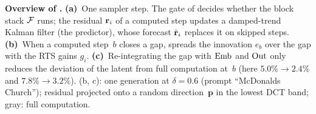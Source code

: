 %     
\caption{\textbf{Overview of \ours.}
\textbf{(a)}~One sampler step. The \sea gate of \seacache decides whether the block stack $\blocks$ runs; the residual
$\res_i$ of a computed step updates a damped-trend Kalman filter (the predictor), whose forecast $\hat\res_i$ replaces
it on skipped steps. \textbf{(b)}~When a computed step~$b$ closes a gap, \pcgs spreads the innovation $e_b$ over the gap
with the RTS gains $g_i$. \textbf{(c)}~Re-integrating the gap with $\Emb$ and $\Out$ only reduces the deviation of the
latent from full computation at~$b$ (here $5.0\%\to2.4\%$ and $7.8\%\to3.2\%$). (b, c): one \flux generation at
$\delta=0.6$ (prompt ``McDonalds Church''); residual projected onto a random direction~$\mathbf{p}$ in the lowest DCT
band; gray: full computation.}
\label{fig:method}
